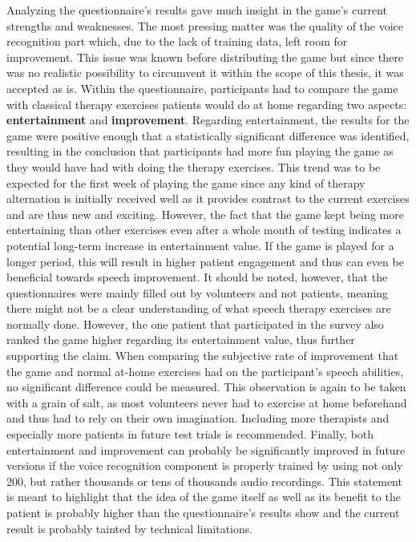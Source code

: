 \documentclass[draft,final]{vutinfth} %
\begin{document}
Analyzing the questionnaire's results gave much insight in the game's current strengths and weaknesses. The most pressing matter was the quality of the voice recognition part which, due to the lack of training data, left room for improvement. This issue was known before distributing the game but since there was no realistic possibility to circumvent it within the scope of this thesis, it was accepted as is. Within the questionnaire, participants had to compare the game with classical therapy exercises patients would do at home regarding two aspects: \textbf{entertainment} and \textbf{improvement}. Regarding entertainment, the results for the game were positive enough that a statistically significant difference was identified, resulting in the conclusion that participants had more fun playing the game as they would have had with doing the therapy exercises. This trend was to be expected for the first week of playing the game since any kind of therapy alternation is initially received well as it provides contrast to the current exercises and are thus new and exciting. However, the fact that the game kept being more entertaining than other exercises even after a whole month of testing indicates a potential long-term increase in entertainment value.  If the game is played for a longer period, this will result in higher patient engagement and thus can even be beneficial towards speech improvement. It should be noted, however, that the questionnaires were mainly filled out by volunteers and not patients, meaning there might not be a clear understanding of what speech therapy exercises are normally done. However, the one patient that participated in the survey also ranked the game higher regarding its entertainment value, thus further supporting the claim. When comparing the subjective rate of improvement that the game and normal at-home exercises had on the participant's speech abilities, no significant difference could be measured. This observation is again to be taken with a grain of salt, as most volunteers never had to exercise at home beforehand and thus had to rely on their own imagination. Including more therapists and especially more patients in future test trials is recommended. Finally, both entertainment and improvement can probably be significantly improved in future versions if the voice recognition component is properly trained by using not only 200, but rather thousands or tens of thousands audio recordings. This statement is meant to highlight that the idea of the game itself as well as its benefit to the patient is probably higher than the questionnaire's results show and the current result is probably tainted by technical limitations. \\
\end{document}
